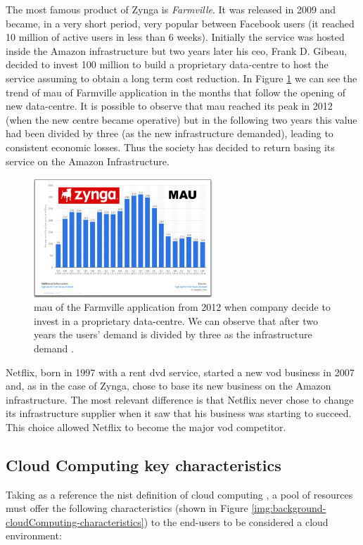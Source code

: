 The most famous product of Zynga is \textit{Farmville}. It was released in 2009 and became, in a very
short period, very popular between Facebook users (it reached 10 million of active users in less than
6 weeks). Initially the service was hosted inside the Amazon infrastructure but two years later his
\acs{ceo}, Frank D. Gibeau, decided to invest \textdollar{}100 million to build a proprietary data-centre
to host the service assuming to obtain a long term cost reduction. In Figure
\ref{img:background-capexOpex-zyngaCase} we can see the trend of \ac{mau} of Farmville application
in the months that follow the opening of new data-centre. It is possible to observe that \ac{mau} reached
its peak in 2012 (when the new centre became operative) but in the following two years this value had
been divided by three (as the new infrastructure demanded), leading to consistent economic losses.
Thus the society has decided to return basing its service on the Amazon Infrastructure.

\begin{figure}
	\centering{}
	\includegraphics[width=0.6\textwidth]{chapters/background/images/zynga-case.png}
	\caption[\acs{mau} of Farmville application after 2012]{\acf{mau} of the Farmville application from
		2012 when company decide to invest in a proprietary data-centre. We can observe that after two
		years the users' demand is divided by three as the infrastructure demand \cite{netflixZynga}.}
	\label{img:background-capexOpex-zyngaCase}
\end{figure}

Netflix, born in 1997 with a rent \acs{dvd} service, started a new \ac{vod} business in 2007 and, as
in the case of Zynga, chose to base its new business on the Amazon infrastructure. The most relevant
difference is that Netflix never chose to change its infrastructure supplier when it saw that his
business was starting to succeed. This choice allowed Netflix to become the major \ac{vod} competitor.

\subsection*{Cloud Computing key characteristics}
\label{sec:background-cloudComputing-characteristics}
Taking as a reference the \ac{nist} definition of cloud computing \cite{nistCloudComputing}, a pool of resources
must offer the following characteristics (shown in Figure \ref{img:background-cloudComputing-characteristics})
to the end-users to be considered a cloud environment:

